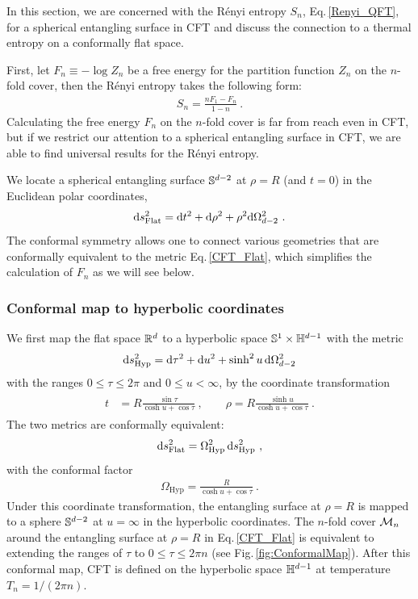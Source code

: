 In this section, we are concerned with the R{\'e}nyi entropy $S_n$, Eq.\,\eqref{Renyi_QFT}, for a spherical entangling surface in CFT and discuss the connection to a thermal entropy on a conformally flat space.

First, let $F_n \equiv - \log Z_n$ be a free energy for the partition function $Z_n$ on the $n$-fold cover, then the R{\'e}nyi entropy takes the following form:
\begin{align}\label{RenyiNewDef}
S_n = \frac{n F_1 - F_n}{1-n} \ .
\end{align}
Calculating the free energy $F_n$ on the $n$-fold cover is far from reach even in CFT, but if we restrict our attention to a spherical entangling surface in CFT, we are able to find universal results for the R{\'e}nyi entropy.

We locate a spherical entangling surface $\mathbb{S}^{d-2}$ at $\rho=R$ (and $t=0$) in the Euclidean polar coordinates,
\begin{align}\label{CFT_Flat}
\mathrm{d} s^2_\text{Flat} = \mathrm{d} t^2 + \mathrm{d}\rho^2 + \rho^2 \mathrm{d}\Omega_{d-2}^2 \ .
\end{align}
The conformal symmetry allows one to connect various geometries that are  conformally equivalent to the metric Eq.\,\eqref{CFT_Flat}, which simplifies the calculation of $F_n$ as we will see below.


\subsubsection{Conformal map to hyperbolic coordinates}\label{ss:Rel_to_Therm}
We first map the flat space $\mathbb{R}^d$ to a hyperbolic space $\mathbb{S}^1 \times \mathbb{H}^{d-1}$ with the metric
\begin{align}\label{CFT_Hyp}
\mathrm{d} s^2_\text{Hyp} = \mathrm{d}\tau^2 + \mathrm{d} u^2 + \sinh^2 u \,\mathrm{d}\Omega_{d-2}^2 
\end{align}
with the ranges $0\le \tau \le 2\pi$ and $0\le u <\infty$, by the coordinate transformation 
\begin{align}\label{BoundaryCM}
\begin{aligned}
t &= R \frac{ \sin\tau}{\cosh u + \cos\tau} \ , \qquad
\rho = R \frac{\sinh u}{\cosh u + \cos\tau} \ .
\end{aligned}
\end{align}
The two metrics are conformally equivalent:
\begin{align}
	\mathrm{d} s^2_\text{Flat} = \Omega^2_\text{Hyp}\, \mathrm{d} s^2_\text{Hyp} \ ,	
\end{align}
with the conformal factor
\begin{align}
	\Omega_\text{Hyp} = \frac{R}{\cosh u + \cos \tau} \ .
\end{align}
Under this coordinate transformation, the entangling surface at $\rho=R$ is mapped to a sphere $\mathbb{S}^{d-2}$ at $u=\infty$ in the hyperbolic coordinates.
The $n$-fold cover ${\cal M}_n$ around the entangling surface at $\rho= R$ in Eq.\,\eqref{CFT_Flat} is equivalent to extending the ranges of $\tau$ to $0\le \tau \le 2\pi n$ (see Fig.\,\ref{fig:ConformalMap}).
After this conformal map, CFT is defined on the hyperbolic space $\mathbb{H}^{d-1}$ at temperature $T_n=1/(2\pi n)$.


